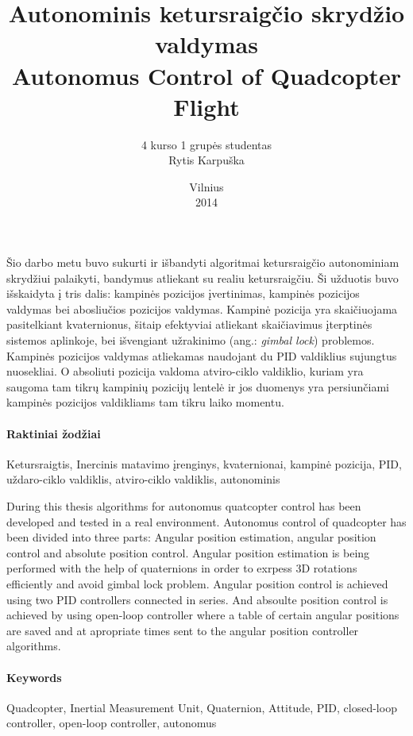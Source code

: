 \documentclass[12pt, a4paper, lithuanian, final]{article}
\title{Autonominis ketursraigčio skrydžio valdymas\\Autonomus Control of Quadcopter Flight}
\author{
    4 kurso 1 grupės studentas \\
    Rytis Karpuška
}
\date{Vilnius \\
	2014}
\begin{document}
\maketitle

Šio darbo metu buvo sukurti ir išbandyti algoritmai ketursraigčio autonominiam skrydžiui palaikyti, bandymus atliekant su realiu ketursraigčiu.
Ši užduotis buvo išskaidyta į tris dalis: kampinės pozicijos įvertinimas, kampinės pozicijos valdymas bei abosliučios pozicijos valdymas.
Kampinė pozicija yra skaičiuojama pasitelkiant kvaternionus, šitaip efektyviai atliekant skaičiavimus įterptinės sistemos aplinkoje, bei išvengiant užrakinimo (ang.: \textit{gimbal lock}) problemos.
Kampinės pozicijos valdymas atliekamas naudojant du PID valdiklius sujungtus nuosekliai.
O absoliuti pozicija valdoma atviro-ciklo valdiklio, kuriam yra saugoma tam tikrų kampinių pozicijų lentelė ir jos duomenys yra persiunčiami kampinės pozicijos valdikliams tam tikru laiko momentu.

\paragraph{Raktiniai žodžiai} Ketursraigtis, Inercinis matavimo įrenginys, kvaternionai, kampinė pozicija, PID, uždaro-ciklo valdiklis, atviro-ciklo valdiklis, autonominis



During this thesis algorithms for autonomus quatcopter control has been developed and tested in a real environment.
Autonomus control of quadcopter has been divided into three parts: Angular position estimation, angular position control and absolute position control.
Angular position estimation is being performed with the help of quaternions in order to exrpess 3D rotations efficiently and avoid gimbal lock problem.
Angular position control is achieved using two PID controllers connected in series.
And absoulte position control is achieved by using open-loop controller where a table of certain angular positions are saved and at apropriate times sent to the angular position controller algorithms.

\paragraph{Keywords} Quadcopter, Inertial Measurement Unit, Quaternion, Attitude, PID, closed-loop controller, open-loop controller, autonomus
\end{document}
